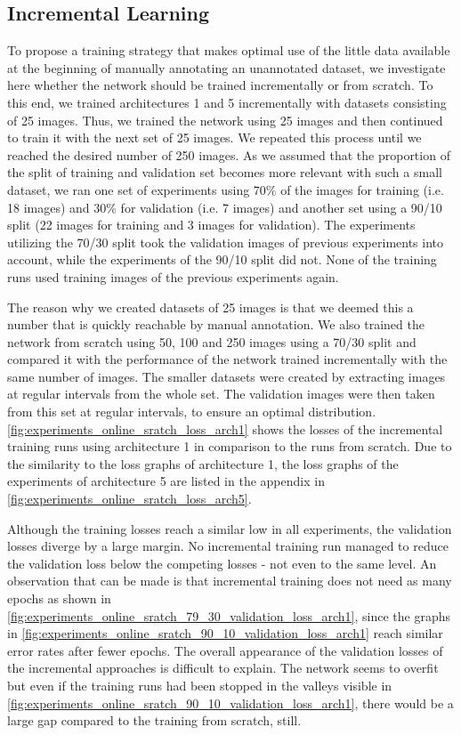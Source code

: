 \subsection{Incremental Learning} \label{subsection:experiments_online_learning}

To propose a training strategy that makes optimal use of the little data available at the beginning of manually annotating an unannotated dataset, we investigate here whether the network should be trained incrementally or from scratch. To this end, we trained architectures 1 and 5 incrementally with datasets consisting of 25 images. Thus, we trained the network using 25 images and then continued to train it with the next set of 25 images. We repeated this process until we reached the desired number of 250 images. As we assumed that the proportion of the split of training and validation set becomes more relevant with such a small dataset, we ran one set of experiments using 70\% of the images for training (i.e. 18 images) and 30\% for validation (i.e. 7 images) and another set using a 90/10 split (22 images for training and 3 images for validation). The experiments utilizing the 70/30 split took the validation images of previous experiments into account, while the experiments of the 90/10 split did not. None of the training runs used training images of the previous experiments again.

The reason why we created datasets of 25 images is that we deemed this a number that is quickly reachable by manual annotation. We also trained the network from scratch using 50, 100 and 250 images using a 70/30 split and compared it with the performance of the network trained incrementally with the same number of images. The smaller datasets were created by extracting images at regular intervals from the whole set. The validation images were then taken from this set at regular intervals, to ensure an optimal distribution. \fig \ref{fig:experiments_online_sratch_loss_arch1} shows the losses of the incremental training runs using architecture 1 in comparison to the runs from scratch. Due to the similarity to the loss graphs of architecture 1, the loss graphs of the experiments of architecture 5 are listed in the appendix in \fig \ref{fig:experiments_online_sratch_loss_arch5}.

Although the training losses reach a similar low in all experiments, the validation losses diverge by a large margin. No incremental training run managed to reduce the validation loss below the competing losses - not even to the same level. An observation that can be made is that incremental training does not need as many epochs as shown in \fig \ref{fig:experiments_online_sratch_79_30_validation_loss_arch1}, since the graphs in \fig \ref{fig:experiments_online_sratch_90_10_validation_loss_arch1} reach similar error rates after fewer epochs. The overall appearance of the validation losses of the incremental approaches is difficult to explain. The network seems to overfit but even if the training runs had been stopped in the valleys visible in \fig \ref{fig:experiments_online_sratch_90_10_validation_loss_arch1}, there would be a large gap compared to the training from scratch, still. 

